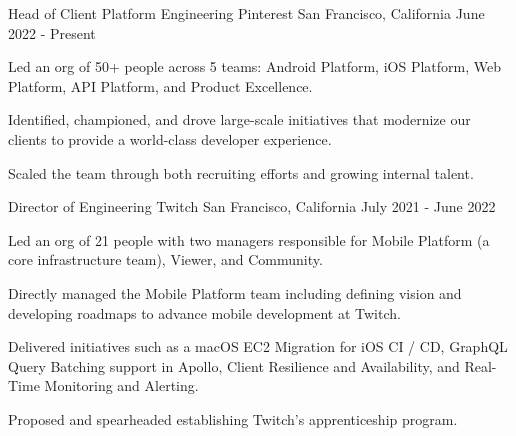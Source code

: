 

\begin{cventries}

  \cventry
    {Head of Client Platform Engineering} %
    {Pinterest} %
    {San Francisco, California} %
    {June 2022 - Present} %
    {
	\begin{cvitems} %
	\item Led an org of 50+ people across 5 teams: Android Platform, iOS Platform, Web Platform, API Platform, and Product Excellence.	
	\item Identified, championed, and drove large-scale initiatives that modernize our clients to provide a world-class developer experience.
	\item Scaled the team through both recruiting efforts and growing internal talent.
	\end{cvitems}
    }

  \cventry
    {Director of Engineering} %
    {Twitch} %
    {San Francisco, California} %
    {July 2021 - June 2022} %
    {
	\begin{cvitems} %
	\item Led an org of 21 people with two managers responsible for Mobile Platform (a core infrastructure team), Viewer, and Community.
	\item Directly managed the Mobile Platform team including defining vision and developing roadmaps to advance mobile development at Twitch.
	\item Delivered initiatives such as a macOS EC2 Migration for iOS CI / CD, GraphQL Query Batching support in Apollo, Client Resilience and Availability, and Real-Time Monitoring and Alerting.
	\item Proposed and spearheaded establishing Twitch’s apprenticeship program.
	\end{cvitems}
    }


\end{cventries}

